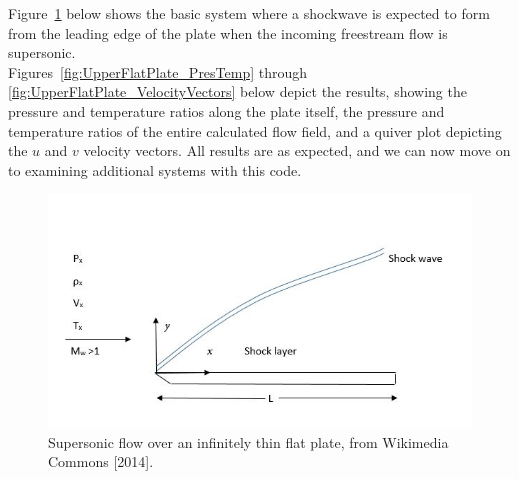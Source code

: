 \documentclass[10pt,a4paper]{article}
\begin{document}
Figure~\ref{fig:wikimedia_flatPlate} below shows the basic system where a shockwave is expected to form from the leading edge of the plate when the incoming freestream flow is supersonic.\\

Figures~\ref{fig:UpperFlatPlate_PresTemp} through \ref{fig:UpperFlatPlate_VelocityVectors} below depict the results, showing the pressure and temperature ratios along the plate itself, the pressure and temperature ratios of the entire calculated flow field, and a quiver plot depicting the $u$ and $v$ velocity vectors. All results are as expected, and we can now move on to examining additional systems with this code.

\FloatBarrier


\begin{figure}[!htb]
	\begin{center}
		\includegraphics[scale=0.6]{images/Supersonic_flow_over_a_sharp_leading_edged_flat_plate_at_zero_incidence.png} 
		\caption{Supersonic flow over an infinitely thin flat plate, from Wikimedia Commons [2014].}
		\label{fig:wikimedia_flatPlate}
	\end{center}
\end{figure}
\end{document}
